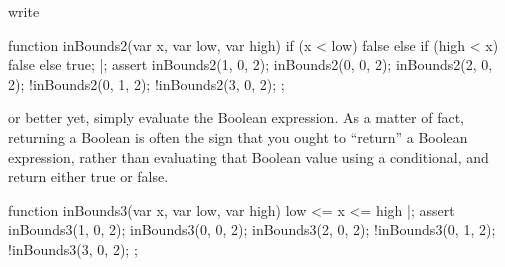 \noindent
write

\begin{urbiscript}
function inBounds2(var x, var low, var high)
{
  if (x < low)
    false
  else if (high < x)
    false
  else
    true;
}|;
assert
{
  inBounds2(1, 0, 2);    inBounds2(0, 0, 2);  inBounds2(2, 0, 2);
  !inBounds2(0, 1, 2);  !inBounds2(3, 0, 2);
};
\end{urbiscript}

\noindent
or better yet, simply evaluate the Boolean expression.  As a matter of fact,
returning a Boolean is often the sign that you ought to ``return'' a Boolean
expression, rather than evaluating that Boolean value using a conditional,
and return either true or false.

\begin{urbiscript}
function inBounds3(var x, var low, var high)
{
  low <= x <= high
}|;
assert
{
  inBounds3(1, 0, 2);    inBounds3(0, 0, 2);  inBounds3(2, 0, 2);
  !inBounds3(0, 1, 2);  !inBounds3(3, 0, 2);
};
\end{urbiscript}


